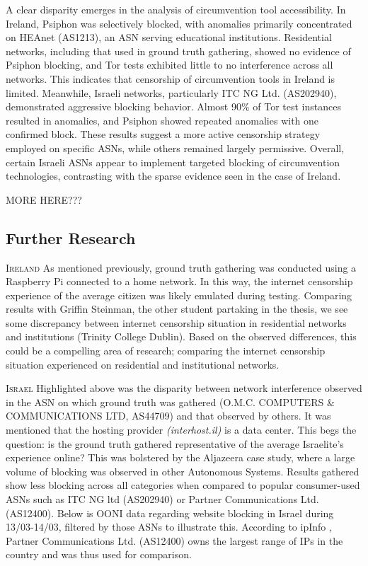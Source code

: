 A clear disparity emerges in the analysis of circumvention tool accessibility. In Ireland, Psiphon was selectively blocked, with anomalies primarily concentrated on HEAnet (AS1213), an ASN serving educational institutions. Residential networks, including that used in ground truth gathering, showed no evidence of Psiphon blocking, and Tor tests exhibited little to no interference across all networks. This indicates that censorship of circumvention tools in Ireland is limited. Meanwhile, Israeli networks, particularly ITC NG Ltd. (AS202940), demonstrated aggressive blocking behavior. Almost 90\% of Tor test instances resulted in anomalies, and Psiphon showed repeated anomalies with one confirmed block. These results suggest a more active censorship strategy employed on specific ASNs, while others remained largely permissive. Overall, certain Israeli ASNs appear to implement targeted blocking of circumvention technologies, contrasting with the sparse evidence seen in the case of Ireland.


MORE HERE???

\subsection{Further Research}
\textsc{Ireland}
As mentioned previously, ground truth gathering was conducted using a Raspberry Pi connected to a home network. In this way, the internet censorship experience of the average citizen was likely emulated during testing. Comparing results with Griffin Steinman, the other student partaking in the thesis, we see some discrepancy between internet censorship situation in residential networks and institutions (Trinity College Dublin). Based on the observed differences, this could be a compelling area of research; comparing the internet censorship situation experienced on residential and institutional networks. 

\textsc{Israel}
Highlighted above was the disparity between network interference observed in the ASN on which ground truth was gathered (O.M.C. COMPUTERS \& COMMUNICATIONS LTD, AS44709) and that observed by others. It was mentioned that the hosting provider \textit{(interhost.il)} is a data center. This begs the question: is the ground truth gathered representative of the average Israelite's experience online? This was bolstered by the Aljazeera case study, where a large volume of blocking was observed in other Autonomous Systems. Results gathered show less blocking across all categories when compared to popular consumer-used ASNs such as ITC NG ltd (AS202940) or Partner Communications Ltd. (AS12400). Below is OONI data regarding website blocking in Israel during 13/03-14/03, filtered by those ASNs to illustrate this. According to ipInfo \cite{ipinfo_israel_asns}, Partner Communications Ltd. (AS12400) owns the largest range of IPs in the country and was thus used for comparison.

